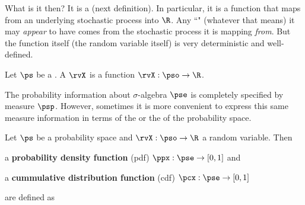What is it then? It is a  (next definition).
In particular, it is a function that maps from an underlying stochastic process into $\R$.
Any ``" (whatever that means) it may \emph{appear} to have comes from the stochastic process it 
is mapping \emph{from}. But the function itself (the random variable itself) is very deterministic and well-defined.
%
\begin{definition}
Let $\ps$ be a  .
A  $\rvX$ is a function $\rvX:\pso\to\R$.
\end{definition}

The probability information about $\sigma$-algebra $\pse$ is completely
specified by measure $\psp$.
However, sometimes it is more convenient to express this same measure
information in terms of the  or the
 of the probability space.
\begin{definition}
\label{def:pdf}
\label{def:cdf}
Let $\ps$ be a probability space and
$\rvX:\pso\to\R$ a random variable. Then
\begin{liste}
  \item a {\bf probability density function} (pdf)      $\ppx:\pse\to[0,1]$ and
   \item a {\bf cummulative distribution function} (cdf) $\pcx:\pse\to[0,1]$
\end{liste}
are defined as
\end{definition}

